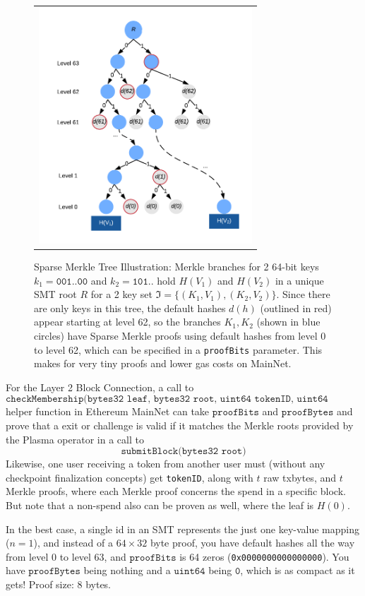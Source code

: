\documentclass{article}
\newcommand{\hash}[1]{H(#1)}
\newcommand{\proofBits}{\texttt{proofBits}}
\newcommand{\proofBytes}{\texttt{proofBytes}}
\begin{document}
\begin{figure}[t]
\begin{tabular}{c}
\centerline{\includegraphics[width=8cm]{SMT.png}} \\
\end{tabular}
\caption{\small Sparse Merkle Tree Illustration: Merkle branches for 2 64-bit keys $k_1=\texttt{001..00}$ and $k_2=\texttt{101..}$ hold $\hash{V_1}$ and $\hash{V_2}$ in a unique SMT root $R$ for a 2 key set $\mathfrak{I} = \{ (K_1, V_1), (K_2, V_2) \}$. Since there are only keys in this tree, the default hashes $d(h)$ (outlined in red) appear starting at level 62, so the branches $K_1, K_2$ (shown in blue circles) have Sparse Merkle proofs using default hashes from level 0 to level 62, which can be specified in a \texttt{proofBits} parameter.  This makes for very tiny proofs and lower gas costs on MainNet. }
\centering
\label{smt}
\end{figure}

For the Layer 2 Block Connection, a call to
\[
\texttt{checkMembership(bytes32 leaf, bytes32 root, uint64 tokenID, uint64 proofBits, bytes proofBytes)}
\]
helper function in Ethereum MainNet can take $\proofBits$ and $\proofBytes$ and prove that a exit or challenge is valid if it matches the Merkle roots provided by the Plasma operator in a call to
\[
\texttt{submitBlock(bytes32 root)}
\]
Likewise, one user receiving a token from another user must (without any checkpoint finalization concepts) get \texttt{tokenID}, along with $t$ raw txbytes, and $t$ Merkle proofs, where each Merkle proof concerns the spend in a specific block. But note that a non-spend also can be proven as well, where the leaf is $H(0)$.

In the best case, a single id in an SMT represents the just one key-value mapping ($n=1$), and instead of a $64 \times 32$ byte proof, you have default hashes all the way from level 0 to level 63, and $\proofBits$ is 64 zeros (\texttt{0x0000000000000000}). You have $\proofBytes$ being nothing and a $\texttt{uint64}$ being $\texttt{0}$, which is as compact as it gets! Proof size: 8 bytes.
\end{document}
